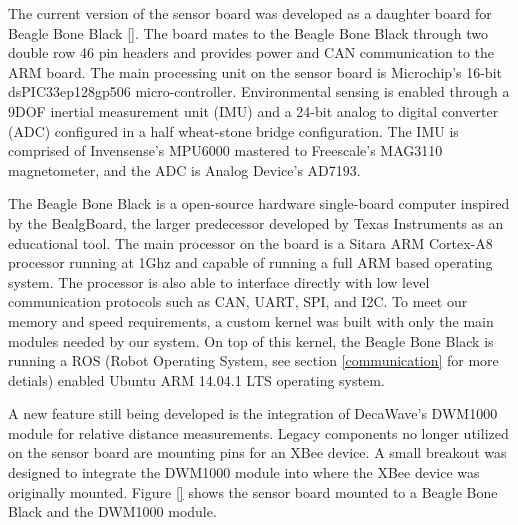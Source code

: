 The current version of the sensor board was developed as a daughter board for Beagle Bone Black \ref{}.
The board mates to the Beagle Bone Black through two double row 46 pin headers and provides power and CAN communication to the ARM board.
The main processing unit on the sensor board is Microchip's 16-bit dsPIC33ep128gp506 micro-controller.
Environmental sensing is enabled through a 9DOF inertial measurement unit (IMU) and a 24-bit analog to digital converter (ADC) configured in a half wheat-stone bridge configuration.
The IMU is comprised of Invensense's MPU6000 mastered to Freescale's MAG3110 magnetometer, and the ADC is Analog Device's AD7193.

The Beagle Bone Black is a open-source hardware single-board computer inspired by the BealgBoard, the larger predecessor developed by Texas Instruments as an educational tool.
The main processor on the board is a Sitara ARM Cortex-A8 processor running at 1Ghz and capable of running a full ARM based operating system.
The processor is also able to interface directly with low level communication protocols such as CAN, UART, SPI, and I2C.
To meet our memory and speed requirements, a custom kernel was built with only the main modules needed by our system.
On top of this kernel, the Beagle Bone Black is running a ROS (Robot Operating System, see section \ref{communication} for more detials) enabled Ubuntu ARM 14.04.1 LTS operating system.

A new feature still being developed is the integration of DecaWave's DWM1000 module for relative distance measurements.
Legacy components no longer utilized on the sensor board are mounting pins for an XBee device.
A small breakout was designed to integrate the DWM1000 module into where the XBee device was originally mounted.
Figure \ref{} shows the sensor board mounted to a Beagle Bone Black and the DWM1000 module.

